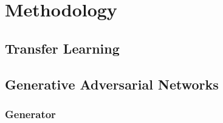 \section{Methodology}

\subsection{Transfer Learning}

\lipsum[3]

\subsection{Generative Adversarial Networks}

\lipsum[1]

\subsubsection{Generator}